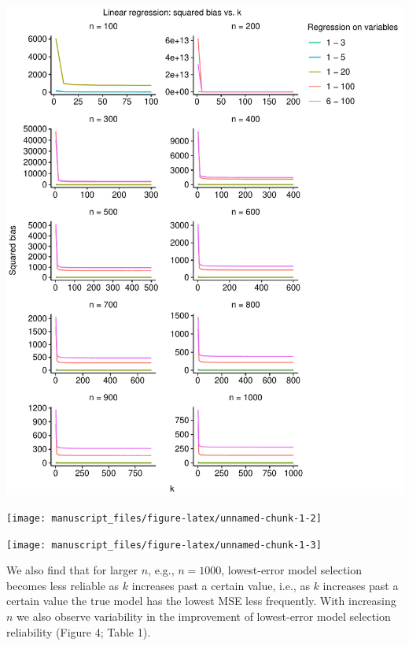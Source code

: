 \documentclass[
  12pt,
]{article}
\begin{document}
\begin{center}\includegraphics{manuscript_files/figure-latex/unnamed-chunk-1-1} \end{center}

\begin{center}\texttt{[image: manuscript\_files/figure-latex/unnamed-chunk-1-2]} \end{center}

\begin{center}\texttt{[image: manuscript\_files/figure-latex/unnamed-chunk-1-3]} \end{center}

We also find that for larger \(n\), e.g., \(n = 1000\), lowest-error
model selection becomes less reliable as \(k\) increases past a certain
value, i.e., as \(k\) increases past a certain value the true model has
the lowest MSE less frequently. With increasing \(n\) we also observe
variability in the improvement of lowest-error model selection
reliability (Figure 4; Table 1).
\end{document}
